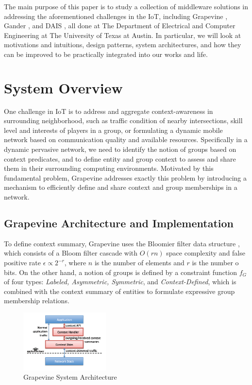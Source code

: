 \documentclass[11pt,onecolumn]{article}
\begin{document}
The main purpose of this paper is to study a collection of middleware solutions in addressing the aforementioned challenges in the IoT, including Grapevine \cite{grapevine}, Gander \cite{michel2013gander}, and DAIS \cite{dais}, all done at The Department of Electrical and Computer Engineering at The University of Texas at Austin. In particular, we will look at motivations and intuitions, design patterns, system architectures, and how they can be improved to be practically integrated into our works and life.

\section{System Overview}
One challenge in IoT is to address and aggregate context-awareness in surrounding neighborhood, such as traffic condition of nearby intersections, skill level and interests of players in a group, or formulating a dynamic mobile network based on communication quality and available resources. Specifically in a dynamic pervasive network, we need to identify the notion of groups based on context predicates, and to define entity and group context to assess and share them in their surrounding computing environments.  Motivated by this fundamental problem, Grapevine \cite{grapevine} addresses exactly this problem by introducing a mechanism to efficiently define and share context and group memberships in a network.

\subsection{Grapevine Architecture and Implementation}

To define context summary, Grapevine uses the Bloomier filter data structure \cite{chazelle2004bloomier}, which consists of a Bloom filter cascade with $O(rn)$ space complexity and false positive rate $\epsilon \propto 2^{-r}$, where $n$ is the number of elements and $r$ is the number o bits. On the other hand, a notion of groups is defined by a constraint function $f_G$ of four types: {\em Labeled, Asymmetric, Symmetric}, and {\em Context-Defined}, which is combined with the context summary of entities to formulate expressive group membership relations.

\begin{figure}
\vspace{-20pt}
  \begin{center}
    \includegraphics[width=0.4\textwidth]{resources/grapevine_architecture.png}
  \end{center}
\vspace{-20pt}
  \caption{Grapevine System Architecture \cite{grapevine} \label{grapevine_architecture}}
\end{figure}
\end{document}
